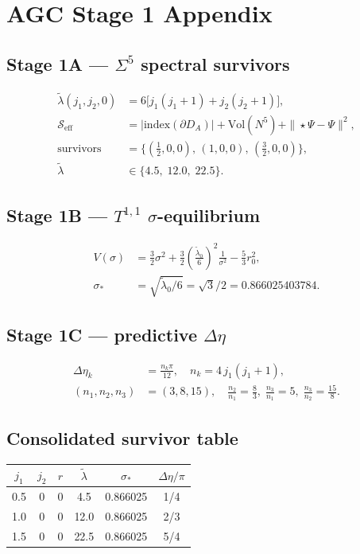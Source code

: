 \section{AGC Stage 1 Appendix}
\subsection{Stage 1A --- $\Sigma^5$ spectral survivors}
\begin{align}
\tilde\lambda(j_1,j_2,0) &= 6\bigl[j_1(j_1+1)+j_2(j_2+1)\bigr], \\
\mathcal{S}_{\mathrm{eff}} &= \bigl|\mathrm{index}(\partial D_A)\bigr|
  + \mathrm{Vol}(N^5) + \|\star\Psi-\Psi\|^2, \\
\text{survivors} &= \{({\textstyle\frac12},0,0),\,(1,0,0),\,({\textstyle\frac32},0,0)\}, \\
\tilde\lambda &\in \{4.5,\;12.0,\;22.5\}.
\end{align}

\subsection{Stage 1B --- $T^{1,1}$ $\sigma$-equilibrium}
\begin{align}
V(\sigma) &= \tfrac{3}{2}\sigma^2 + \tfrac{3}{2}\!\left(\frac{\tilde\lambda_0}{6}\right)^{\!2}\!\frac{1}{\sigma^2}
  - \tfrac{5}{3}r_0^2, \\
\sigma_* &= \sqrt{\tilde\lambda_0/6} = \sqrt{3}/2 = 0.866025403784.
\end{align}

\subsection{Stage 1C --- predictive $\Delta\eta$}
\begin{align}
\Delta\eta_k &= \frac{n_k\pi}{12}, \quad n_k = 4\,j_1(j_1+1), \\
(n_1,n_2,n_3) &= (3,8,15), \quad
\frac{n_2}{n_1}=\frac{8}{3},\;
\frac{n_3}{n_1}=5,\;
\frac{n_3}{n_2}=\frac{15}{8}.
\end{align}

\subsection{Consolidated survivor table}
\begin{center}
\begin{tabular}{cccccc}
\hline
$j_1$ & $j_2$ & $r$ & $\tilde\lambda$ & $\sigma_*$ & $\Delta\eta/\pi$ \\
\hline
0.5 & 0 & 0 & 4.5  & 0.866025 & 1/4 \\
1.0 & 0 & 0 & 12.0 & 0.866025 & 2/3 \\
1.5 & 0 & 0 & 22.5 & 0.866025 & 5/4 \\
\hline
\end{tabular}
\end{center}

